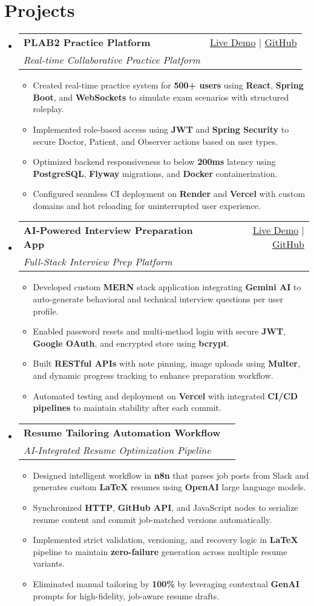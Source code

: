 \documentclass[letterpaper,10pt]{article}
\makeatletter
\newcommand{\resumeItem}[1]{\item\small{#1 \vspace{-2pt}}}
\newcommand{\resumeSubheading}[4]{
  \vspace{-1pt}\item
    \begin{tabular*}{0.97\textwidth}[t]{l@{\extracolsep{\fill}}r}
      \textbf{#1} & #2 \\
      \textit{\small#3} & \textit{\small #4} \\
    \end{tabular*}\vspace{-5pt}
}
\newcommand{\resumeSubHeadingListStart}{\begin{itemize}[leftmargin=*]}
\newcommand{\resumeSubHeadingListEnd}{\end{itemize}}
\newcommand{\resumeItemListStart}{\begin{itemize}}
\newcommand{\resumeItemListEnd}{\end{itemize}\vspace{-5pt}}
\makeatother
\begin{document}
\section{Projects}
  \resumeSubHeadingListStart
    \resumeSubheading
      {\textbf{PLAB2 Practice Platform}}{\href{https://plab2practice.com}{Live Demo} | \href{https://github.com/altansaid/plab2projectnew}{GitHub}}
      {Real-time Collaborative Practice Platform}{}
      \resumeItemListStart
        \resumeItem{Created real-time practice system for \textbf{500+ users} using \textbf{React}, \textbf{Spring Boot}, and \textbf{WebSockets} to simulate exam scenarios with structured roleplay.}
        \resumeItem{Implemented role-based access using \textbf{JWT} and \textbf{Spring Security} to secure Doctor, Patient, and Observer actions based on user types.}
        \resumeItem{Optimized backend responsiveness to below \textbf{200ms} latency using \textbf{PostgreSQL}, \textbf{Flyway} migrations, and \textbf{Docker} containerization.}
        \resumeItem{Configured seamless CI deployment on \textbf{Render} and \textbf{Vercel} with custom domains and hot reloading for uninterrupted user experience.}
      \resumeItemListEnd

    \resumeSubheading
      {\textbf{AI-Powered Interview Preparation App}}{\href{https://interviewcoach-ai.vercel.app}{Live Demo} | \href{https://github.com/altansaid/interviewcoach-ai}{GitHub}}
      {Full-Stack Interview Prep Platform}{}
      \resumeItemListStart
        \resumeItem{Developed custom \textbf{MERN} stack application integrating \textbf{Gemini AI} to auto-generate behavioral and technical interview questions per user profile.}
        \resumeItem{Enabled password resets and multi-method login with secure \textbf{JWT}, \textbf{Google OAuth}, and encrypted store using \textbf{bcrypt}.}
        \resumeItem{Built \textbf{RESTful APIs} with note pinning, image uploads using \textbf{Multer}, and dynamic progress tracking to enhance preparation workflow.}
        \resumeItem{Automated testing and deployment on \textbf{Vercel} with integrated \textbf{CI/CD pipelines} to maintain stability after each commit.}
      \resumeItemListEnd

    \resumeSubheading
      {\textbf{Resume Tailoring Automation Workflow}}{} {AI-Integrated Resume Optimization Pipeline}{}
      \resumeItemListStart
        \resumeItem{Designed intelligent workflow in \textbf{n8n} that parses job posts from Slack and generates custom \textbf{LaTeX} resumes using \textbf{OpenAI} large language models.}
        \resumeItem{Synchronized \textbf{HTTP}, \textbf{GitHub API}, and JavaScript nodes to serialize resume content and commit job-matched versions automatically.}
        \resumeItem{Implemented strict validation, versioning, and recovery logic in \textbf{LaTeX} pipeline to maintain \textbf{zero-failure} generation across multiple resume variants.}
        \resumeItem{Eliminated manual tailoring by \textbf{100\%} by leveraging contextual \textbf{GenAI} prompts for high-fidelity, job-aware resume drafts.}
      \resumeItemListEnd
  \resumeSubHeadingListEnd
\end{document}
